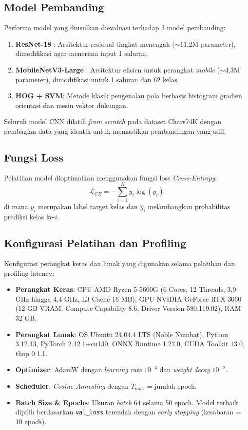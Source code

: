 \documentclass[journal]{IEEEtran}
\begin{document}
\subsection{Model Pembanding}
Performa model yang diusulkan dievaluasi terhadap 3 model pembanding:
\begin{enumerate}
    \item \textbf{ResNet-18} \cite{he2016deep}: Arsitektur residual tingkat menengah ($\sim$11,2M parameter), dimodifikasi agar menerima input 1 saluran.
    \item \textbf{MobileNetV3-Large} \cite{howard2019searching}: Arsitektur efisien untuk perangkat \textit{mobile} ($\sim$4,3M parameter), dimodifikasi untuk 1 saluran dan 62 kelas.
    \item \textbf{HOG + SVM}: Metode klasik pengenalan pola berbasis histogram gradien orientasi dan mesin vektor dukungan.
\end{enumerate}
Seluruh model CNN dilatih \textit{from scratch} pada dataset Chars74K dengan pembagian data yang identik untuk memastikan pembandingan yang adil.

\subsection{Fungsi Loss}
Pelatihan model dioptimalkan menggunakan fungsi loss \textit{Cross-Entropy}:
\begin{equation}
\mathcal{L}_{CE} = -\sum_{i=1}^{N} y_i \log(\hat{y}_i)
\end{equation}
di mana $y_i$ merupakan label target kelas dan $\hat{y}_i$ melambangkan probabilitas prediksi kelas ke-$i$.

\subsection{Konfigurasi Pelatihan dan Profiling}
Konfigurasi perangkat keras dan lunak yang digunakan selama pelatihan dan profiling latency:
\begin{itemize}
    \item \textbf{Perangkat Keras}: CPU AMD Ryzen 5 5600G (6 Cores, 12 Threads, 3,9 GHz hingga 4,4 GHz, L3 Cache 16 MB), GPU NVIDIA GeForce RTX 3060 (12 GB VRAM, Compute Capability 8.6, Driver Version 580.119.02), RAM 32 GB.
    \item \textbf{Perangkat Lunak}: OS Ubuntu 24.04.4 LTS (Noble Numbat), Python 3.12.13, PyTorch 2.12.1+cu130, ONNX Runtime 1.27.0, CUDA Toolkit 13.0, thop 0.1.1.
    \item \textbf{Optimizer}: AdamW \cite{loshchilov2019decoupled} dengan \textit{learning rate} $10^{-3}$ dan \textit{weight decay} $10^{-2}$.
    \item \textbf{Scheduler}: \textit{Cosine Annealing} dengan $T_{max}$ = jumlah epoch.
    \item \textbf{Batch Size \& Epochs}: Ukuran \textit{batch} 64 selama 50 epoch. Model terbaik dipilih berdasarkan \texttt{val\_loss} terendah dengan \textit{early stopping} (kesabaran = 10 epoch).
\end{itemize}
\end{document}
